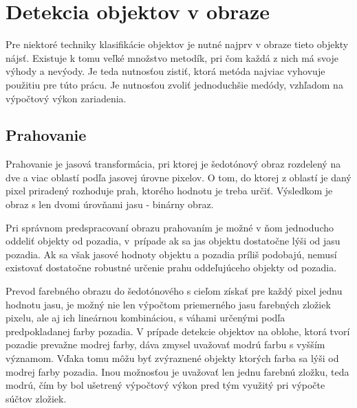 \chapter{Detekcia objektov v obraze}

    Pre niektoré techniky klasifikácie objektov je nutné najprv v obraze tieto objekty nájsť. Existuje k tomu veľké množstvo metodík, pri čom každá z nich má svoje výhody a nevýody. Je teda nutnosťou zistiť, ktorá metóda najviac vyhovuje použitiu pre túto prácu. Je nutnosťou zvoliť jednoduchšie medódy, vzhľadom na výpočtový výkon zariadenia.

\section{Prahovanie}

    Prahovanie je jasová transformácia, pri ktorej je šedotónový obraz rozdelený na dve a viac oblastí podľa jasovej úrovne pixelov. O tom, do ktorej z oblastí je daný pixel priradený rozhoduje prah, ktorého hodnotu je treba určiť. Výsledkom je obraz s len dvomi úrovňami jasu - binárny obraz.

    Pri správnom predspracovaní obrazu prahovaním je možné v ňom jednoducho oddeliť objekty od pozadia, v~prípade ak sa jas objektu dostatočne lýši od jasu pozadia. Ak sa však jasové hodnoty objektu a pozadia príliš podobajú, nemusí existovať dostatočne robustné určenie prahu oddeľujúceho objekty od pozadia. \cite{Morse1998/1} \cite{Buhl2023}

    Prevod farebného obrazu do šedotónového s cieľom získať pre každý pixel jednu hodnotu jasu, je možný nie len výpočtom priemerného jasu farebných zložiek pixelu, ale aj ich lineárnou kombináciou, s váhami určenými podľa predpokladanej farby pozadia. V prípade detekcie objektov na oblohe, ktorá tvorí pozadie prevažne modrej farby, dáva zmysel uvažovať modrú farbu s vyšším významom. Vďaka tomu môžu byť zvýraznené objekty ktorých farba sa lýši od modrej farby pozadia. Inou možnosťou je uvažovať len jednu farebnú zložku, teda modrú, čím by bol ušetrený výpočtový výkon pred tým využitý pri výpočte súčtov zložiek.

